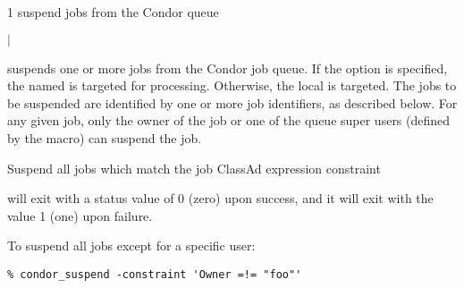 \begin{ManPage}{\label{man-condor-suspend}}{1}
{suspend jobs from the Condor queue}
\Synopsis {}
\ToolArgsBase

\ToolDebugOption
\ToolLocate
\ToolJobs
$|$  \Dots

\ToolDebugOption
\ToolLocate
\ToolAll


\Description

 suspends one or more jobs from the Condor job queue.  
If the  option is specified, the named  is targeted
for processing.  
Otherwise, the local  is targeted.
The jobs to be suspended are identified by one or more job identifiers, as
described below.
For any given job, only the owner of the job or one of the queue super users
(defined by the  macro) can suspend the job.

\begin{Options}
	\ToolArgsBaseDesc
	\ToolLocateDesc
    \ToolDebugDesc
	 {Suspend all jobs which match
	                the job ClassAd expression constraint}
\end{Options}

\ExitStatus

 will exit with a status value of 0 (zero) upon success,
and it will exit with the value 1 (one) upon failure.

\Examples
To suspend all jobs except for a specific user:
\footnotesize
\begin{verbatim}
% condor_suspend -constraint 'Owner =!= "foo"'
\end{verbatim}
\normalsize

\end{ManPage}
